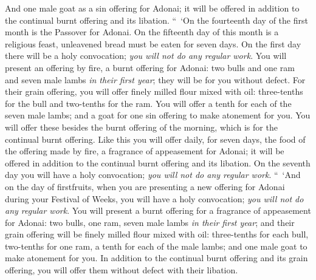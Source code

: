 \begin{biblechapter}
\verse And one male goat as a sin offering for Adonai; it will be offered in addition to the continual burnt offering and its libation.
\verse “ ‘On the fourteenth day of the first month is the Passover for Adonai.
\verse On the fifteenth day of this month is a religious feast, unleavened bread must be eaten for seven days.
\verse On the first day there will be a holy convocation; \textit{you will not do any regular work}.
\verse You will present an offering by fire, a burnt offering for Adonai: two bulls and one ram and seven male lambs \textit{in their first year}; they will be for you without defect.
\verse For their grain offering, you will offer finely milled flour mixed with oil: three-tenths for the bull and two-tenths for the ram.
\verse You will offer a tenth for each of the seven male lambs;
\verse and a goat for one sin offering to make atonement for you.
\verse You will offer these besides the burnt offering of the morning, which is for the continual burnt offering.
\verse Like this you will offer daily, for seven days, the food of the offering made by fire, a fragrance of appeasement for Adonai; it will be offered in addition to the continual burnt offering and its libation.
\verse On the seventh day you will have a holy convocation; \textit{you will not do any regular work}.
 “ ‘And on the day of firstfruits, when you are presenting a new offering for Adonai during your Festival of Weeks, you will have a holy convocation; \textit{you will not do any regular work}.
\verse You will present a burnt offering for a fragrance of appeasement for Adonai: two bulls, one ram, seven male lambs \textit{in their first year};
\verse and their grain offering will be finely milled flour mixed with oil: three-tenths for each bull, two-tenths for one ram,
\verse a tenth for each of the male lambs;
\verse and one male goat to make atonement for you.
\verse In addition to the continual burnt offering and its grain offering, you will offer them without defect with their libation.
\end{biblechapter}

